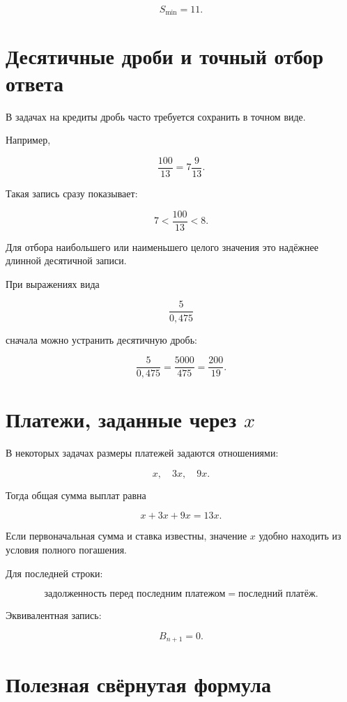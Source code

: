 \documentclass[a4paper,12pt]{article}
\begin{document}
\[
\boxed{S_{\min}=11}.
\]


\section{Десятичные дроби и точный отбор ответа}

В задачах на кредиты дробь часто требуется сохранить в точном виде.

Например,

\[
\frac{100}{13}
=
7\frac9{13}.
\]

Такая запись сразу показывает:

\[
7<\frac{100}{13}<8.
\]

Для отбора наибольшего или наименьшего целого значения это надёжнее длинной
десятичной записи.

При выражениях вида

\[
\frac{5}{0{,}475}
\]

сначала можно устранить десятичную дробь:

\[
\frac{5}{0{,}475}
=
\frac{5000}{475}
=
\frac{200}{19}.
\]


\section{Платежи, заданные через \(x\)}

В некоторых задачах размеры платежей задаются отношениями:

\[
x,\quad 3x,\quad 9x.
\]

Тогда общая сумма выплат равна

\[
x+3x+9x=13x.
\]

Если первоначальная сумма и ставка известны, значение \(x\) удобно находить
из условия полного погашения.

Для последней строки:

\[
\boxed{\text{задолженность перед последним платежом}
=
\text{последний платёж}.}
\]

Эквивалентная запись:

\[
B_{n+1}=0.
\]


\section{Полезная свёрнутая формула}
\end{document}
